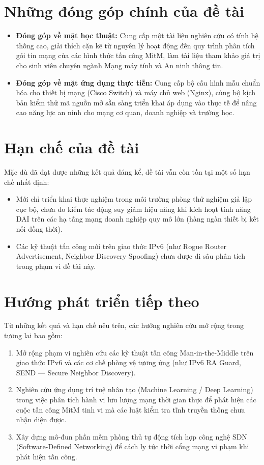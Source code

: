 \section{Những đóng góp chính của đề tài}

\begin{itemize}
  \item \textbf{Đóng góp về mặt học thuật:} Cung cấp một tài liệu nghiên cứu có tính hệ thống cao, giải thích cặn kẽ từ nguyên lý hoạt động đến quy trình phân tích gói tin mạng của các hình thức tấn công MitM, làm tài liệu tham khảo giá trị cho sinh viên chuyên ngành Mạng máy tính và An ninh thông tin.
  \item \textbf{Đóng góp về mặt ứng dụng thực tiễn:} Cung cấp bộ cấu hình mẫu chuẩn hóa cho thiết bị mạng (Cisco Switch) và máy chủ web (Nginx), cùng bộ kịch bản kiểm thử mã nguồn mở sẵn sàng triển khai áp dụng vào thực tế để nâng cao năng lực an ninh cho mạng cơ quan, doanh nghiệp và trường học.
\end{itemize}

\section{Hạn chế của đề tài}

Mặc dù đã đạt được những kết quả đáng kể, đề tài vẫn còn tồn tại một số hạn chế nhất định:
\begin{itemize}
  \item Mới chỉ triển khai thực nghiệm trong môi trường phòng thử nghiệm giả lập cục bộ, chưa đo kiểm tác động suy giảm hiệu năng khi kích hoạt tính năng DAI trên các hạ tầng mạng doanh nghiệp quy mô lớn (hàng ngàn thiết bị kết nối đồng thời).
  \item Các kỹ thuật tấn công mới trên giao thức IPv6 (như Rogue Router Advertisement, Neighbor Discovery Spoofing) chưa được đi sâu phân tích trong phạm vi đề tài này.
\end{itemize}

\section{Hướng phát triển tiếp theo}

Từ những kết quả và hạn chế nêu trên, các hướng nghiên cứu mở rộng trong tương lai bao gồm:
\begin{enumerate}
  \item Mở rộng phạm vi nghiên cứu các kỹ thuật tấn công Man-in-the-Middle trên giao thức IPv6 và các cơ chế phòng vệ tương ứng (như IPv6 RA Guard, SEND --- Secure Neighbor Discovery).
  \item Nghiên cứu ứng dụng trí tuệ nhân tạo (Machine Learning / Deep Learning) trong việc phân tích hành vi lưu lượng mạng thời gian thực để phát hiện các cuộc tấn công MitM tinh vi mà các luật kiểm tra tĩnh truyền thống chưa nhận diện được.
  \item Xây dựng mô-đun phần mềm phòng thủ tự động tích hợp công nghệ SDN (Software-Defined Networking) để cách ly tức thời cổng mạng vi phạm khi phát hiện tấn công.
\end{enumerate}
